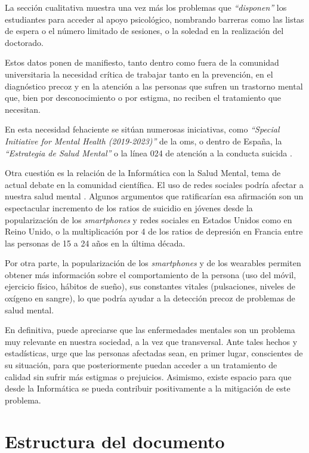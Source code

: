     La sección cualitativa muestra una vez más los problemas que\textit{ ``disponen''} los estudiantes para acceder al apoyo psicológico, nombrando barreras como las listas de espera o el número limitado de sesiones, o la soledad en la realización del doctorado.
    
    Estos datos ponen de manifiesto, tanto dentro como fuera de la comunidad universitaria la necesidad crítica de trabajar tanto en la prevención, en el diagnóstico precoz y en la atención a las personas que sufren un trastorno mental que, bien por desconocimiento o por estigma, no reciben el tratamiento que necesitan.
    
    En esta necesidad fehaciente se sitúan numerosas iniciativas, como \textit{``Special Initiative for Mental Health (2019-2023)''} \cite{oms_salud_nodate} de la \gls{oms}, o dentro de España, la \textit{``Estrategia de Salud Mental''} o la línea 024 de atención a la conducta suicida \cite{la_moncloa_minones_2023}.

    Otra cuestión es la relación de la Informática con la Salud Mental, tema de actual debate en la comunidad científica. El uso de redes sociales podría afectar a nuestra salud mental \cite{burn-murdoch_smartphones_2023}. Algunos argumentos que ratificarían esa afirmación son un espectacular incremento de los ratios de suicidio en jóvenes desde la popularización de los \textit{smartphones} y redes sociales en Estados Unidos como en Reino Unido, o la multiplicación por 4 de los ratios de depresión en Francia entre las personas de 15 a 24 años en la última década.
    
    Por otra parte, la popularización de los \textit{smartphones} y de los \glspl{wearable} permiten obtener más información sobre el comportamiento de la persona (uso del móvil, ejercicio físico, hábitos de sueño), sus constantes vitales (pulsaciones, niveles de oxígeno en sangre), lo que podría ayudar a la detección precoz de problemas de salud mental.
    
    En definitiva, puede apreciarse que las enfermedades mentales son un problema muy relevante en nuestra sociedad, a la vez que transversal. Ante tales hechos y estadísticas, urge que las personas afectadas sean, en primer lugar, conscientes de su situación, para que posteriormente puedan acceder a un tratamiento de calidad sin sufrir más estigmas o prejuicios. Asimismo, existe espacio para que desde la Informática se pueda contribuir positivamente a la mitigación de este problema.
    

\section{Estructura del documento}

